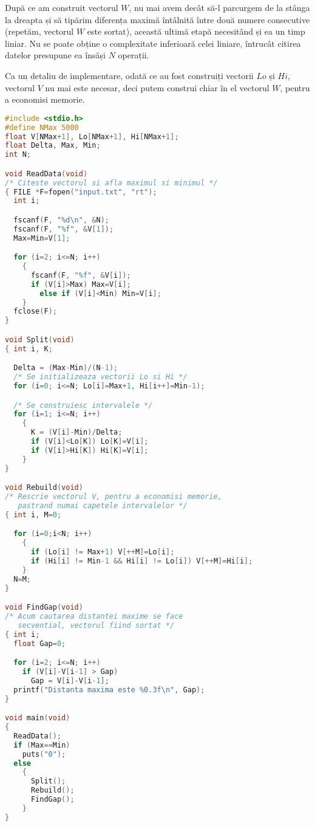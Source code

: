 După ce am construit vectorul $W$, nu mai avem decât să-l parcurgem de la stânga la dreapta și să tipărim diferența maximă întâlnită între două numere consecutive (repetăm, vectorul $W$ este sortat), această ultimă etapă necesitând și ea un timp liniar. Nu se poate obține o complexitate inferioară celei liniare, întrucât citirea datelor presupune ea însăși $N$ operații.

Ca un detaliu de implementare, odată ce au fost construiți vectorii $Lo$ și $Hi$, vectorul $V$ nu mai este necesar, deci putem construi chiar în el vectorul $W$, pentru a economisi memorie.

\begin{lstlisting}[language=C]
#include <stdio.h>
#define NMax 5000
float V[NMax+1], Lo[NMax+1], Hi[NMax+1];
float Delta, Max, Min;
int N;

void ReadData(void)
/* Citeste vectorul si afla maximul si minimul */
{ FILE *F=fopen("input.txt", "rt");
  int i;

  fscanf(F, "%d\n", &N);
  fscanf(F, "%f", &V[1]);
  Max=Min=V[1];

  for (i=2; i<=N; i++)
    {
      fscanf(F, "%f", &V[i]);
      if (V[i]>Max) Max=V[i];
        else if (V[i]<Min) Min=V[i];
    }
  fclose(F);
}

void Split(void)
{ int i, K;

  Delta = (Max-Min)/(N-1);
  /* Se initializeaza vectorii Lo si Hi */
  for (i=0; i<=N; Lo[i]=Max+1, Hi[i++]=Min-1);

  /* Se construiesc intervalele */
  for (i=1; i<=N; i++)
    {
      K = (V[i]-Min)/Delta;
      if (V[i]<Lo[K]) Lo[K]=V[i];
      if (V[i]>Hi[K]) Hi[K]=V[i];
    }
}

void Rebuild(void)
/* Rescrie vectorul V, pentru a economisi memorie,
   pastrand numai capetele intervalelor */
{ int i, M=0;

  for (i=0;i<N; i++)
    {
      if (Lo[i] != Max+1) V[++M]=Lo[i];
      if (Hi[i] != Min-1 && Hi[i] != Lo[i]) V[++M]=Hi[i];
    }
  N=M;
}

void FindGap(void)
/* Acum cautarea distantei maxime se face
   secvential, vectorul fiind sortat */
{ int i;
  float Gap=0;

  for (i=2; i<=N; i++)
    if (V[i]-V[i-1] > Gap)
      Gap = V[i]-V[i-1];
  printf("Distanta maxima este %0.3f\n", Gap);
}

void main(void)
{
  ReadData();
  if (Max==Min)
    puts("0");
  else
    {
      Split();
      Rebuild();
      FindGap();
    }
}
\end{lstlisting}

